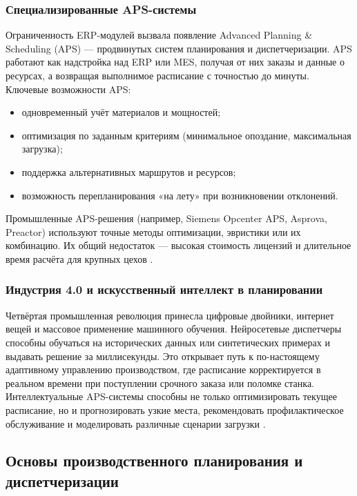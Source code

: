 \subsubsection{Специализированные APS-системы}

Ограниченность ERP-модулей вызвала появление Advanced Planning \& Scheduling (APS) — продвинутых систем планирования и диспетчеризации. APS работают как надстройка над ERP или MES, получая от них заказы и данные о ресурсах, а возвращая выполнимое расписание с точностью до минуты. Ключевые возможности APS:

\begin{itemize}
    \item одновременный учёт материалов и мощностей;
    \item оптимизация по заданным критериям (минимальное опоздание, максимальная загрузка);
    \item поддержка альтернативных маршрутов и ресурсов;
    \item возможность перепланирования «на лету» при возникновении отклонений.
\end{itemize}

Промышленные APS-решения (например, Siemens Opcenter APS, Asprova, Preactor) используют точные методы оптимизации, эвристики или их комбинацию. Их общий недостаток — высокая стоимость лицензий и длительное время расчёта для крупных цехов \cite{ISOP}.

\subsubsection{Индустрия 4.0 и искусственный интеллект в планировании}

Четвёртая промышленная революция принесла цифровые двойники, интернет вещей и массовое применение машинного обучения. Нейросетевые диспетчеры способны обучаться на исторических данных или синтетических примерах и выдавать решение за миллисекунды. Это открывает путь к по-настоящему адаптивному управлению производством, где расписание корректируется в реальном времени при поступлении срочного заказа или поломке станка. Интеллектуальные APS-системы способны не только оптимизировать текущее расписание, но и прогнозировать узкие места, рекомендовать профилактическое обслуживание и моделировать различные сценарии загрузки \cite{generativ}.

\subsection{Основы производственного планирования и диспетчеризации}

